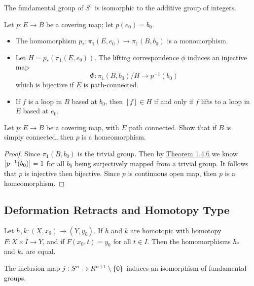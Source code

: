 \documentclass[12pt,a4paper]{article}
\begin{document}
    \begin{thm}
        The fundamental group of $S^1$ is isomorphic to the additive group of integers.
    \end{thm}
    \bigskip

    \begin{thm}
        Let $p:E\to B$ be a covering map; let $p(e_0)=b_0$.
        \begin{itemize}
            \item The homomorphism $p_*:\pi_1(E,e_0)\to \pi_1(B,b_0)$ is a monomorphism.
            \item Let $H=p_*(\pi_1(E,e_0))$. The lifting correspondence $\phi$ induces an injective map
            \[
                \Phi:\pi_1(B,b_0)/H\to p^{-1}(b_0)
            \]
            which is bijective if $E$ is path-connected.
            \item If $f$ is a loop in $B$ based at $b_0$, then $[f]\in H$ if and only if $f$ lifts to a loop in $E$ based at $e_0$.
        \end{itemize}
    \end{thm}
    \bigskip

    \begin{ex}
        Let $p:E\to B$ be a covering map, with $E$ path connected. Show that if $B$ is simply connected, then $p$ is a homeomorphism.
    \end{ex}
    \begin{proof}
        Since $\pi_1(B,b_0)$ is the trivial group. Then by \hyperref[1.4.6]{Theorem 1.4.6} we know $\left\lvert p^{-1}(b_0) \right\rvert=1$ for all $b_0$ being surjectively mapped from a trivial group. It follows that $p$ is injective then bijective. Since $p$ is continuous open map, then $p$ is a homeomorphism. 
    \end{proof}
    \bigskip

    \subsection{Deformation Retracts and Homotopy Type}
    \begin{lemma}
        Let $h,k:(X,x_0)\to (Y,y_0)$. If $h$ and $k$ are homotopic with homotopy $F:X\times I\to Y$, and if $F(x_0,t)=y_0$ for all $t\in I$. Then the homomorphisms $h_*$ and $k_*$ are equal.
    \end{lemma}
    \bigskip

    \begin{thm}
        The inclusion map $j:S^n\to R^{n+1}\setminus\left\{ 0 \right\}$ induces an isomorphism of fundamental groups.
    \end{thm}
    \bigskip
\end{document}
